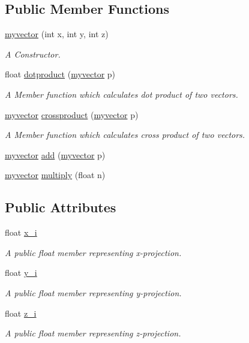 \subsection*{Public Member Functions}
\begin{DoxyCompactItemize}
\item 
\hyperlink{classmyvector_a50e56a1d0b5e3ba44c2cd87eb45cb7b4}{myvector} (int x, int y, int z)
\begin{DoxyCompactList}\small\item\em A Constructor. \end{DoxyCompactList}\item 
float \hyperlink{classmyvector_ab4164e997ce091642ba28a92b4db8cc6}{dotproduct} (\hyperlink{classmyvector}{myvector} p)
\begin{DoxyCompactList}\small\item\em A Member function which calculates dot product of two vectors. \end{DoxyCompactList}\item 
\hyperlink{classmyvector}{myvector} \hyperlink{classmyvector_af0caba3b74e0614eef1ccdff67372409}{crossproduct} (\hyperlink{classmyvector}{myvector} p)
\begin{DoxyCompactList}\small\item\em A Member function which calculates cross product of two vectors. \end{DoxyCompactList}\item 
\hyperlink{classmyvector}{myvector} \hyperlink{classmyvector_a2d07d77de689b075bbbe933a777197d1}{add} (\hyperlink{classmyvector}{myvector} p)
\item 
\hyperlink{classmyvector}{myvector} \hyperlink{classmyvector_a8eb11a1551c0ae3093f23cbd2a8b61fd}{multiply} (float n)
\end{DoxyCompactItemize}
\subsection*{Public Attributes}
\begin{DoxyCompactItemize}
\item 
float \hyperlink{classmyvector_ab893220476df8f4d0710871d02b76fe0}{x\+\_\+i}
\begin{DoxyCompactList}\small\item\em A public float member representing x-\/projection. \end{DoxyCompactList}\item 
float \hyperlink{classmyvector_ab61d4e74c6c20e28c93b23253c562889}{y\+\_\+i}
\begin{DoxyCompactList}\small\item\em A public float member representing y-\/projection. \end{DoxyCompactList}\item 
float \hyperlink{classmyvector_a1dcafb966fd664d2b6c633cd90f05216}{z\+\_\+i}
\begin{DoxyCompactList}\small\item\em A public float member representing z-\/projection. \end{DoxyCompactList}\end{DoxyCompactItemize}


